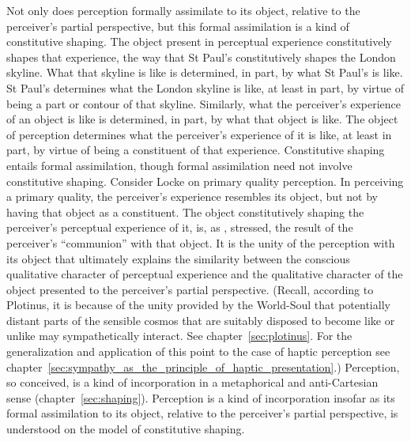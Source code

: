 Not only does perception formally assimilate to its object, relative to the perceiver's partial perspective, but this formal assimilation is a kind of constitutive shaping. The object present in perceptual experience constitutively shapes that experience, the way that St Paul's constitutively shapes the London skyline. What that skyline is like is determined, in part, by what St Paul's is like. St Paul's determines what the London skyline is like, at least in part, by virtue of being a part or contour of that skyline. Similarly, what the perceiver's experience of an object is like is determined, in part, by what that object is like. The object of perception determines what the perceiver's experience of it is like, at least in part, by virtue of being a constituent of that experience. Constitutive shaping entails formal assimilation, though formal assimilation need not involve constitutive shaping. Consider Locke on primary quality perception. In perceiving a primary quality, the perceiver's experience resembles its object, but not by having that object as a constituent. The object constitutively shaping the perceiver's perceptual experience of it, is, as \citet{Ardley:1958aa}, stressed, the result of the perceiver's ``communion'' with that object. It is the unity of the perception with its object that ultimately explains the similarity between the conscious qualitative character of perceptual experience and the qualitative character of the object presented to the perceiver's partial perspective. (Recall, according to Plotinus, it is because of the unity provided by the World-Soul that potentially distant parts of the sensible cosmos that are suitably disposed to become like or unlike may sympathetically interact. See chapter~\ref{sec:plotinus}. For the generalization and application of this point to the case of haptic perception see chapter~\ref{sec:sympathy_as_the_principle_of_haptic_presentation}.) Perception, so conceived, is a kind of incorporation in a metaphorical and anti-Cartesian sense (chapter~\ref{sec:shaping}). Perception is a kind of incorporation insofar as its formal assimilation to its object, relative to the perceiver’s partial perspective, is understood on the model of constitutive shaping. 

